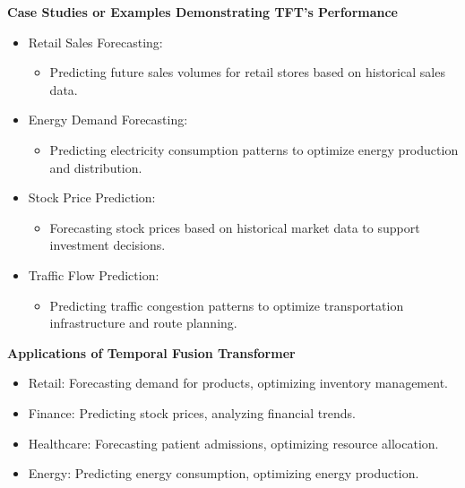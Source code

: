 \begin{frame}
		\textbf{Case Studies or Examples Demonstrating TFT's Performance}
	\begin{itemize}
		\item Retail Sales Forecasting:
		\begin{itemize}
			\item Predicting future sales volumes for retail stores based on historical sales data.
		\end{itemize}
		
		\item Energy Demand Forecasting:
		\begin{itemize}
			\item Predicting electricity consumption patterns to optimize energy production and distribution.
		\end{itemize}
		
		\item Stock Price Prediction:
		\begin{itemize}
			\item Forecasting stock prices based on historical market data to support investment decisions.
		\end{itemize}
		
		\item Traffic Flow Prediction:
		\begin{itemize}
			\item Predicting traffic congestion patterns to optimize transportation infrastructure and route planning.
		\end{itemize}
	\end{itemize}	
\end{frame}	

				\begin{frame}
			\textbf{Applications of Temporal Fusion Transformer}
	\begin{itemize}
		\item Retail: Forecasting demand for products, optimizing inventory management.
		\item Finance: Predicting stock prices, analyzing financial trends.
		\item Healthcare: Forecasting patient admissions, optimizing resource allocation.
		\item Energy: Predicting energy consumption, optimizing energy production.
	\end{itemize}
	\end{frame}	
		
